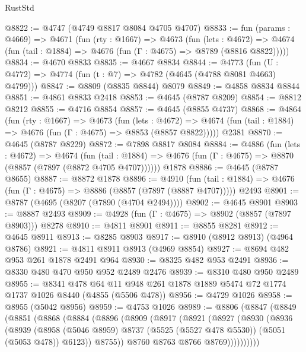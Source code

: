 \begin{lexlean}{RustStd}
\begin{coremodule}
@8822 := @4747 (@4749 @8817 @8084 @4705 @4707)
@8833 := fun (params : @4669) =>
  @4671
    (fun (rty : @1667) =>
    @4673
      (fun (lets : @4672) =>
      @4674 (fun (tail : @1884) => @4676 (fun (Γ : @4675) => @8789 (@8816 @8822)))))
@8834 := @4670 @8833
@8835 := @4667 @8834
@8844 := @4773 (fun (U : @4772) => @4774 (fun (t : @7) => @4782 (@4645 (@4788 @8081 @4663) @4799)))
@8847 := @8809 (@8835 @8844) @8079
@8849 := @4858 @8834 @8844
@8851 := @4861 @8833 @2418
@8853 := @4645 (@8787 @8209)
@8854 := @8812 @8212
@8855 := @4716 @8854
@8857 := @4645 (@8855 @4737)
@8868 := @4864
    (fun (rty : @1667) =>
    @4673
      (fun (lets : @4672) =>
      @4674 (fun (tail : @1884) => @4676 (fun (Γ : @4675) => @8853 (@8857 @8822)))))
    @2381
@8870 := @4645 (@8787 @8229)
@8872 := @7898 @8817 @8084
@8884 := @4886
    (fun (lets : @4672) =>
    @4674
      (fun (tail : @1884) => @4676 (fun (Γ : @4675) => @8870 (@8857 (@7897 (@8872 @4705 @4707))))))
    @1878
@8886 := @4645 (@8787 @8655)
@8887 := @8872 @1878
@8896 := @4910
    (fun (tail : @1884) => @4676 (fun (Γ : @4675) => @8886 (@8857 (@7897 (@8887 @4707)))))
    @2493
@8901 := @8787 (@4695 (@8207 (@7890 (@4704 @2494))))
@8902 := @4645 @8901
@8903 := @8887 @2493
@8909 := @4928 (fun (Γ : @4675) => @8902 (@8857 (@7897 @8903))) @8278
@8910 := @4811 @8901
@8911 := @8855 @8281
@8912 := @4645 @8911
@8913 := @8285 @8903
@8917 := @8910 (@8912 @8913) (@4964 @8786)
@8921 := @4811 @8911 @8913 (@4969 @8854)
@8927 := @8694 @482 @953 @261 @1878 @2491 @964
@8930 := @8325 @482 @953 @2491
@8936 := @8330 @480 @470 @950 @952 @2489 @2476
@8939 := @8310 @480 @950 @2489
@8955 := @8341
    @478
    @64
    @11
    @948
    @261
    @1878
    @1889
    @5474
    @72
    @1774
    @1737
    @1026
    @8440
    (@4855 (@5506 @478))
@8956 := @4729 @1026
@8958 := @8955 (@5042 @8956)
@8959 := @4753 @1026
@8989 := @8806
    (@8847
      (@8849
        (@8851
          (@8868
            (@8884
              (@8896
                (@8909
                  (@8917
                    (@8921
                      (@8927
                        (@8930
                          (@8936
                            (@8939
                              (@8958
                                (@5046 @8959)
                                @8737
                                (@5525 (@5527 @478 @5530))
                                (@5051 (@5053 @478))
                                @6123))
                            @8755))
                        @8760
                        @8763
                        @8766
                        @8769))))))))))

\end{coremodule}
\end{lexlean}
